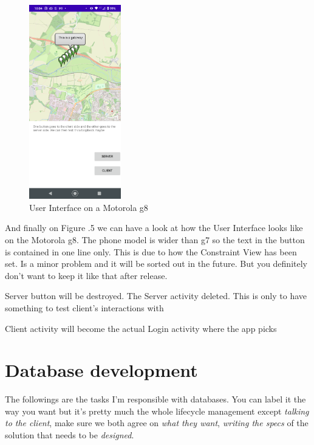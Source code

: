 \documentclass[a4paper,12pt]{article}
\begin{document}
\clearpage  

\begin{figure}
\centering
\includegraphics[width=4cm]{./current_status_g8.PNG}
\caption{User Interface on a Motorola g8}\label{wrap-fig:5}
\end{figure}






And finally on Figure .5 we can have a look at how the User Interface looks like on the Motorola g8. The phone model is wider than g7 so the text in the button is contained in one line only. This is due to how the Constraint View has been set. Is a minor problem and it will be sorted out in the future. But you definitely don't want to keep it like that after release.

Server button will be destroyed. The Server activity deleted. This is only to have something to test client's interactions with

Client activity will become the actual Login activity where the app picks









\section{Database development}

The followings are the tasks I'm responsible with databases. You can label it the way you want but it's pretty much the whole lifecycle management except \emph{talking to the client}, make sure we both agree on \emph{what they want}, \emph{writing the specs} of the solution that needs to be \emph{designed}.
\end{document}
